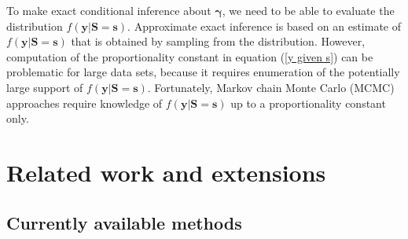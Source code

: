 \documentclass[article, shortnames]{jss}
\begin{document}
To make exact conditional inference about $\mathbf{\gamma }$,
we need to be able to evaluate the distribution
$f\left(\mathbf{y}|\mathbf{S=s}\right)$.
Approximate exact inference is
based on an estimate of $f\left(\mathbf{y}|\mathbf{S=s}\right)$
that is obtained by sampling from the distribution.
However, computation of the
proportionality constant in equation (\ref{y given s})
can be problematic for large data sets, because it
requires enumeration of the potentially large support of
$f\left( \mathbf{y}|\mathbf{S=s}\right)$.
Fortunately, Markov chain Monte Carlo (MCMC)
approaches require knowledge of $f\left( \mathbf{y}|\mathbf{S=s}\right)$
up to a proportionality constant only.

\section{Related work and extensions} \label{rwae}

\subsection{Currently available methods}
\end{document}
